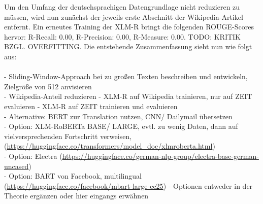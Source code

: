 \noindent
Um den Umfang der deutschsprachigen Datengrundlage nicht reduzieren zu müssen, wird nun zunächst der jeweils erste Abschnitt der Wikipedia-Artikel entfernt. Ein erneutes Training der \ac{XLM-R} bringt die folgenden \ac{ROUGE}-Scores hervor: R-Recall: 0.00, R-Precision: 0.00, R-Measure: 0.00. TODO: KRITIK BZGL. OVERFITTING. Die entstehende Zusammenfassung sieht nun wie folgt aus:\\

\noindent{}\\

\noindent
- Sliding-Window-Approach bei zu großen Texten beschreiben und entwickeln, Zielgröße von 512 anvisieren\\

\noindent
- Wikipedia-Anteil reduzieren
- XLM-R auf Wikipedia trainieren, nur auf ZEIT evaluieren
- XLM-R auf ZEIT trainieren und evaluieren\\

\noindent
- Alternative: BERT zur Translation nutzen, CNN/ Dailymail übersetzen\\
- Option: XLM-RoBERTa BASE/ LARGE, evtl. zu wenig Daten, dann auf vielversprechenden Fortschritt verweisen, (\url{https://huggingface.co/transformers/model_doc/xlmroberta.html})\\
- Option: Electra (\url{https://huggingface.co/german-nlp-group/electra-base-german-uncased})\\
- Option: BART von Facebook, multilingual (\url{https://huggingface.co/facebook/mbart-large-cc25})
- Optionen entweder in der Theorie ergänzen oder hier eingangs erwähnen

